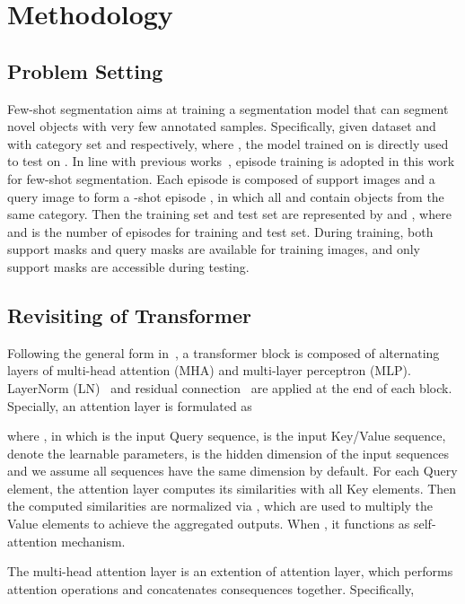\documentclass{article}
\begin{document}
\section{Methodology}
\label{sec:method}
\subsection{Problem Setting}

Few-shot segmentation aims at training a segmentation model that can segment novel objects with very few annotated samples. Specifically, given dataset  and  with category set  and  respectively, where , the model trained on  is directly used to test on . In line with previous works~\cite{tian2020pfenet,wang2019panet,zhang2019canet}, episode training is adopted in this work for few-shot segmentation. Each episode is composed of  support images  and a query image  to form a -shot episode , in which all  and  contain objects from the same category. Then the training set and test set are represented by  and , where  and  is the number of episodes for training and test set. During training, both support masks  and query masks  are available for training images, and only support masks are accessible during testing.


\subsection{Revisiting of Transformer} \label{basic-trans}
Following the general form in~\cite{vaswani2017transformer}, a transformer block is composed of alternating layers of multi-head attention (MHA) and multi-layer perceptron (MLP). LayerNorm (LN)~\cite{ba2016ln} and residual connection~\cite{he2015resnet} are applied at the end of each block. Specially, an attention layer is formulated as

where , in which  is the input Query sequence,  is the input Key/Value sequence,  denote the learnable parameters,  is the hidden dimension of the input sequences and we assume all sequences have the same dimension  by default. For each Query element, the attention layer computes its similarities with all Key elements. Then the computed similarities are normalized via , which are used to multiply the Value elements to achieve the aggregated outputs. When , it functions as self-attention mechanism. 


The multi-head attention layer is an extention of attention layer, which performs  attention operations and concatenates consequences together. Specifically,
\end{document}
